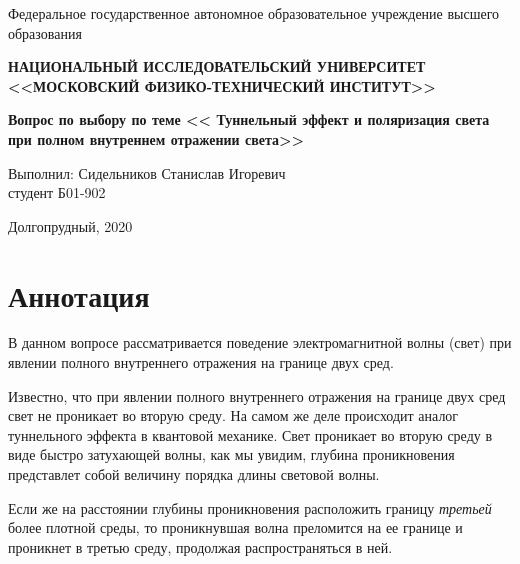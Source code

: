  
 
\usepackage{caption}



\begin{center}
    
    \normalsize{Федеральное государственное автономное образовательное учреждение высшего образования}
    
    \textbf{НАЦИОНАЛЬНЫЙ ИССЛЕДОВАТЕЛЬСКИЙ УНИВЕРСИТЕТ \\ <<МОСКОВСКИЙ ФИЗИКО-ТЕХНИЧЕСКИЙ ИНСТИТУТ>>}
    \vspace{13ex}
    
    \textbf{Вопрос по выбору по теме << Туннельный эффект и поляризация света при полном внутреннем отражении света>>}
    \vspace{40ex}
\end{center}
\begin{flushright}
    \normalsize{Выполнил: Сидельников Станислав Игоревич \\ студент Б01-902\\}
\end{flushright}
    
\vfill
    
\begin{center}
Долгопрудный, 2020
\end{center}

\thispagestyle{empty} %

\newpage

	\section{Аннотация}
	
	В данном вопросе рассматривается поведение электромагнитной волны (свет) при явлении полного внутреннего отражения на границе двух сред. 
	
	Известно, что при явлении полного внутреннего отражения на границе двух сред свет не проникает во вторую среду. На самом же деле происходит аналог туннельного эффекта в квантовой механике. Свет проникает во вторую среду в виде быстро затухающей волны, как мы увидим, глубина проникновения представлет собой величину порядка длины световой волны.
	
	Если же на расстоянии глубины проникновения расположить границу \textit{третьей} более плотной среды, то проникнувшая волна преломится на ее границе и проникнет в третью среду, продолжая распространяться в ней.
	
